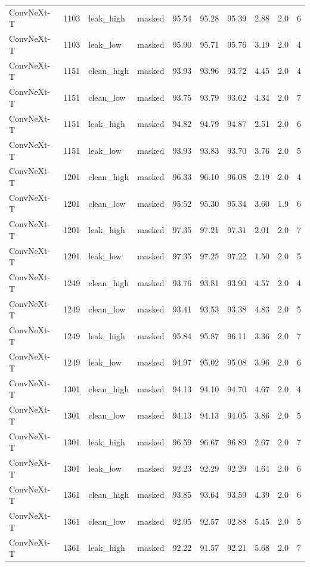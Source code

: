 {\begin{longtable}{lrllrrrrrr}
ConvNeXt-T & 1103 & leak\_high & masked & 95.54 & 95.28 & 95.39 & 2.88 & 2.0 & 6 \\
ConvNeXt-T & 1103 & leak\_low & masked & 95.90 & 95.71 & 95.76 & 3.19 & 2.0 & 4 \\
ConvNeXt-T & 1151 & clean\_high & masked & 93.93 & 93.96 & 93.72 & 4.45 & 2.0 & 4 \\
ConvNeXt-T & 1151 & clean\_low & masked & 93.75 & 93.79 & 93.62 & 4.34 & 2.0 & 7 \\
ConvNeXt-T & 1151 & leak\_high & masked & 94.82 & 94.79 & 94.87 & 2.51 & 2.0 & 6 \\
ConvNeXt-T & 1151 & leak\_low & masked & 93.93 & 93.83 & 93.70 & 3.76 & 2.0 & 5 \\
ConvNeXt-T & 1201 & clean\_high & masked & 96.33 & 96.10 & 96.08 & 2.19 & 2.0 & 4 \\
ConvNeXt-T & 1201 & clean\_low & masked & 95.52 & 95.30 & 95.34 & 3.60 & 1.9 & 6 \\
ConvNeXt-T & 1201 & leak\_high & masked & 97.35 & 97.21 & 97.31 & 2.01 & 2.0 & 7 \\
ConvNeXt-T & 1201 & leak\_low & masked & 97.35 & 97.25 & 97.22 & 1.50 & 2.0 & 5 \\
ConvNeXt-T & 1249 & clean\_high & masked & 93.76 & 93.81 & 93.90 & 4.57 & 2.0 & 4 \\
ConvNeXt-T & 1249 & clean\_low & masked & 93.41 & 93.53 & 93.38 & 4.83 & 2.0 & 5 \\
ConvNeXt-T & 1249 & leak\_high & masked & 95.84 & 95.87 & 96.11 & 3.36 & 2.0 & 7 \\
ConvNeXt-T & 1249 & leak\_low & masked & 94.97 & 95.02 & 95.08 & 3.96 & 2.0 & 6 \\
ConvNeXt-T & 1301 & clean\_high & masked & 94.13 & 94.10 & 94.70 & 4.67 & 2.0 & 4 \\
ConvNeXt-T & 1301 & clean\_low & masked & 94.13 & 94.13 & 94.05 & 3.86 & 2.0 & 5 \\
ConvNeXt-T & 1301 & leak\_high & masked & 96.59 & 96.67 & 96.89 & 2.67 & 2.0 & 7 \\
ConvNeXt-T & 1301 & leak\_low & masked & 92.23 & 92.29 & 92.29 & 4.64 & 2.0 & 6 \\
ConvNeXt-T & 1361 & clean\_high & masked & 93.85 & 93.64 & 93.59 & 4.39 & 2.0 & 6 \\
ConvNeXt-T & 1361 & clean\_low & masked & 92.95 & 92.57 & 92.88 & 5.45 & 2.0 & 5 \\
ConvNeXt-T & 1361 & leak\_high & masked & 92.22 & 91.57 & 92.21 & 5.68 & 2.0 & 7 \\

\end{longtable}}
